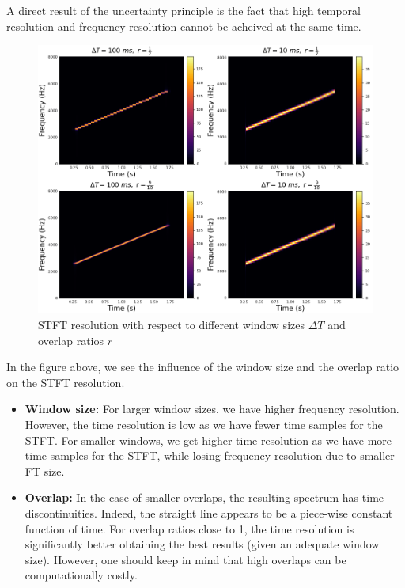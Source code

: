 \documentclass[
  american,
]{article}
\providecommand{\tightlist}{%
  \setlength{\itemsep}{0pt}\setlength{\parskip}{0pt}}
\begin{document}
A direct result of the uncertainty principle is the fact that high temporal resolution
and frequency resolution cannot be acheived at the same time.

\begin{figure}
\centering
\includegraphics{img/stft_resolution.png}
\caption{STFT resolution with respect to different window sizes \(\Delta T\) and overlap ratios \(r\)}
\end{figure}

In the figure above, we see the influence of the window size and the overlap ratio on the
STFT resolution.

\begin{itemize}
\tightlist
\item
  \textbf{Window size:}
  For larger window sizes, we have higher frequency resolution. However, the time resolution is low as we have fewer time samples for the STFT.
  For smaller windows, we get higher time resolution as we have more time samples for the STFT, while losing frequency resolution due to smaller FT size.
\item
  \textbf{Overlap:}
  In the case of smaller overlaps, the resulting spectrum has time discontinuities. Indeed, the straight line appears to be a piece-wise constant function of time.
  For overlap ratios close to 1, the time resolution is significantly better obtaining the best results (given an adequate window size). However, one should keep in mind that high overlaps can be computationally costly.
\end{itemize}
\end{document}

